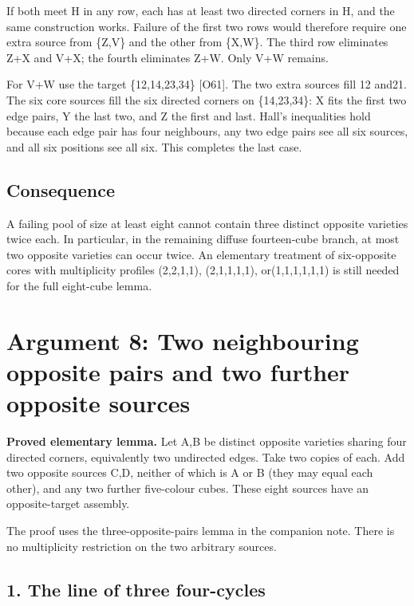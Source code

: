 \documentclass[
  10pt,
]{article}
\begin{document}
If both meet H in any row, each has at least two directed corners in H,
and the same construction works. Failure of the first two rows would
therefore require one extra source from \{Z,V\} and the other from
\{X,W\}. The third row eliminates Z+X and V+X; the fourth eliminates
Z+W. Only V+W remains.

For V+W use the target \{12,14,23,34\} {[}O61{]}. The two extra sources
fill 12 and21. The six core sources fill the six directed corners on
\{14,23,34\}: X fits the first two edge pairs, Y the last two, and Z the
first and last. Hall's inequalities hold because each edge pair has four
neighbours, any two edge pairs see all six sources, and all six
positions see all six. This completes the last case.

\hypertarget{consequence-1}{%
\subsection*{Consequence}\label{consequence-1}}

A failing pool of size at least eight cannot contain three distinct
opposite varieties twice each. In particular, in the remaining diffuse
fourteen-cube branch, at most two opposite varieties can occur twice. An
elementary treatment of six-opposite cores with multiplicity profiles
(2,2,1,1), (2,1,1,1,1), or(1,1,1,1,1,1) is still needed for the full
eight-cube lemma.

\hypertarget{arg-8}{%
\section{Argument 8: Two neighbouring opposite pairs and two further
opposite sources}\label{arg-8}}

\textbf{Proved elementary lemma.} Let A,B be distinct opposite varieties
sharing four directed corners, equivalently two undirected edges. Take
two copies of each. Add two opposite sources C,D, neither of which is A
or B (they may equal each other), and any two further five-colour cubes.
These eight sources have an opposite-target assembly.

The proof uses the three-opposite-pairs lemma in the companion note.
There is no multiplicity restriction on the two arbitrary sources.

\hypertarget{the-line-of-three-four-cycles}{%
\subsection*{1. The line of three
four-cycles}\label{the-line-of-three-four-cycles}}
\end{document}
